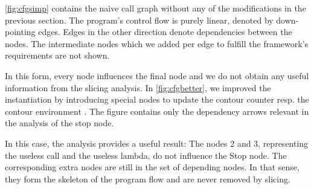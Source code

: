 \documentclass[a4paper,parskip=half,BCOR=8mm,DIV=calc,12pt]{scrbook}
\begin{document}
\vref{fig:cfgsimp} contains the naive call graph without any of the modifications in the previous section. The program’s control flow is purely linear, denoted by down-pointing edges. Edges in the other direction denote dependencies between the nodes. The intermediate nodes which we added per edge to fulfill the framework’s requirements are not shown.

In this form, every node influences the final node and we do not obtain any useful information from the slicing analysis. In \vref{fig:cfgbetter}, we improved the instantiation by introducing special nodes to update the contour counter  resp. the contour environment . The figure contains only the dependency arrows relevant in the analysis of the stop node.

\enlargethispage{3em}
In this case, the analysis provides a useful result: The nodes 2 and 3, representing the useless call and the useless lambda, do not influence the Stop node. The corresponding extra nodes are still in the set of depending nodes. In that sense, they form the skeleton of the program flow and are never removed by slicing.
\end{document}
